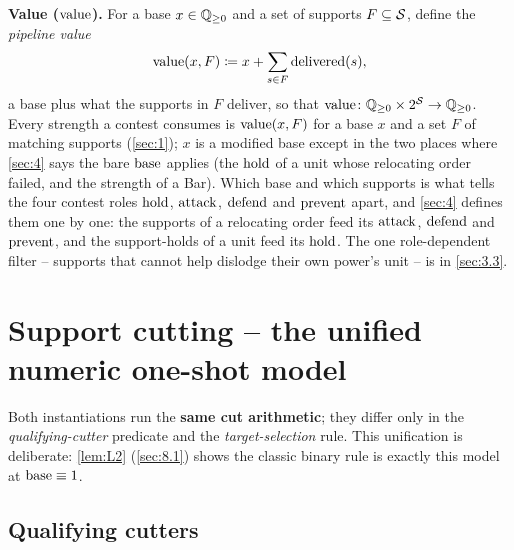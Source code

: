 \documentclass[12pt,a4paper]{article}
\begin{document}
\textbf{Value ($\operatorname{value}$).}
For a base $x \in \mathbb{Q}_{\ge 0}$ and a set of supports $F \subseteq \mathcal{S}$, define the \emph{pipeline value}
\[
\operatorname{value}(x, F) \coloneqq x + \sum_{s \in F} \operatorname{delivered}(s),
\]
a base plus what the supports in $F$ deliver, so that $\operatorname{value}\colon \mathbb{Q}_{\ge 0} \times 2^{\mathcal{S}} \to \mathbb{Q}_{\ge 0}$.
Every strength a contest consumes is $\operatorname{value}(x, F)$ for a base $x$ and a set $F$ of matching supports (\cref{sec:1}); $x$ is a modified base except in the two places where \cref{sec:4} says the bare $\operatorname{base}$ applies (the $\operatorname{hold}$ of a unit whose relocating order failed, and the strength of a Bar).
Which base and which supports is what tells the four contest roles $\operatorname{hold}$, $\operatorname{attack}$, $\operatorname{defend}$ and $\operatorname{prevent}$ apart, and \cref{sec:4} defines them one by one: the supports of a relocating order feed its $\operatorname{attack}$, $\operatorname{defend}$ and $\operatorname{prevent}$, and the support-holds of a unit feed its $\operatorname{hold}$.
The one role-dependent filter -- supports that cannot help dislodge their own power's unit -- is in \cref{sec:3.3}.

\section{Support cutting -- the unified numeric one-shot model}\label{sec:3}

Both instantiations run the \textbf{same cut arithmetic}; they differ only in the \emph{qualifying-cutter} predicate and the \emph{target-selection} rule.
This unification is deliberate: \cref{lem:L2} (\cref{sec:8.1}) shows the classic binary rule is exactly this model at $\operatorname{base} \equiv 1$.

\subsection{Qualifying cutters}\label{sec:3.1}
\end{document}
